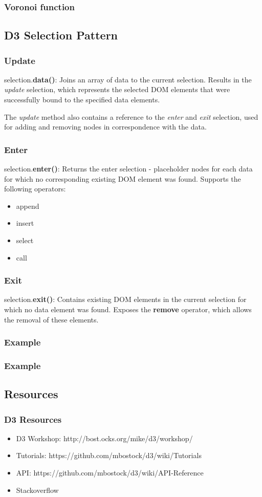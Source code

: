 \documentclass[red]{beamer}
\begin{document}
\begin{frame}
  \frametitle{Voronoi function}
  \lstv
\end{frame}

\subsection{D3 Selection Pattern}
\begin{frame}
  \frametitle{Update}
  selection.\textbf{data()}: Joins an array of data to the current selection. Results in the \textit{update} selection, which represents the selected DOM elements that were successfully bound to the specified data elements.
  \newline

  The \textit{update} method also contains a reference to the \textit{enter} and \textit{exit} selection, used for adding and removing nodes in correspondence with the data.
\end{frame}

\begin{frame}
  \frametitle{Enter}
  selection.\textbf{enter()}: Returns the enter selection - placeholder nodes for each data for which no corresponding existing DOM element was found. Supports the following operators:
  \begin{itemize}
  \item<1->append
  \item<2->insert
  \item<3->select
  \item<4->call
  \end{itemize}

\end{frame}

\begin{frame}
  \frametitle{Exit}
  selection.\textbf{exit()}: Contains existing DOM elements in the current selection for which no data element was found. Exposes the \textbf{remove} operator, which allows the removal of these elements. 
\end{frame}

\begin{frame}
  \frametitle{Example}
  \lstexit
\end{frame}

\begin{frame}
  \frametitle{Example}
  \lstexitl
\end{frame}


\subsection{Resources}
\begin{frame}
  \frametitle{D3 Resources}
  \begin{itemize}
  \item<1-> D3 Workshop: http://bost.ocks.org/mike/d3/workshop/
  \item<2-> Tutorials: https://github.com/mbostock/d3/wiki/Tutorials
  \item<3-> API: https://github.com/mbostock/d3/wiki/API-Reference
  \item<4-> Stackoverflow
  \end{itemize}
\end{frame}
\end{document}

